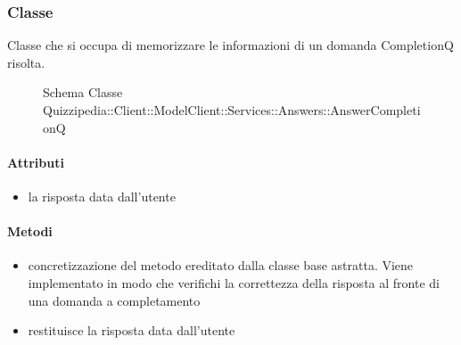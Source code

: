 \subsubsection{Classe }
Classe che si occupa di memorizzare le informazioni di un domanda CompletionQ risolta.
\begin{figure}[H]
\centering
\noindent{}
\caption[Schema Classe AnswerCompletionQ]{Schema Classe Quizzipedia::Client::ModelClient::Services::Answers::AnswerCompletionQ}
\end{figure}
\paragraph{Attributi}
\begin{itemize}
\item {}
\newline
la risposta data dall'utente
\end{itemize}
\paragraph{Metodi}
\begin{itemize}
\item {}
\newline
concretizzazione del metodo ereditato dalla classe base astratta. Viene implementato in modo che verifichi la correttezza della risposta al fronte di una domanda a completamento
\newline
\item {}
\newline
restituisce la risposta data dall'utente
\newline
\end{itemize}
